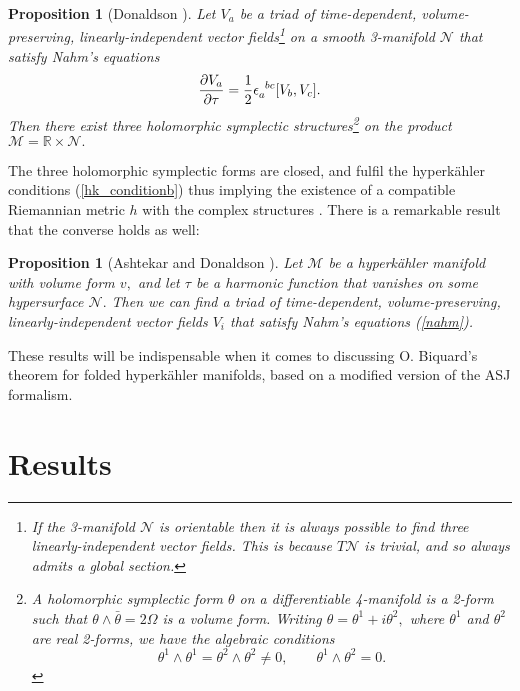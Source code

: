 \documentclass[a4paper,12pt, onecolumn, notitlepage]{article}
\newtheorem{prop}[thm]{Proposition}
\theoremstyle{definition}
\theoremstyle{remark}
\newcommand{\e}{\epsilon}
\newcommand{\ddt}[1]{\frac{\partial #1}{\partial \tau}}
\newcommand{\HK}{hyperk\"ahler }
\newcommand{\R}{\mathbb{R}}
\begin{document}
\begin{prop}[Donaldson \cite{donaldson}]
	Let $V_{a}$ be a triad of time-dependent, volume-preserving, linearly-independent vector fields\footnote{If the 3-manifold $\mathcal{N}$ is orientable then it is always possible to find three linearly-independent vector fields. This is because $T\mathcal{N}$ is trivial, and so always admits a global section.} on a smooth 3-manifold $\mathcal{N}$ that satisfy Nahm's equations
	$$\ddt{V_{a}} = \frac{1}{2}\e\indices{_a^b^c}[V_{b},V_{c}].
	$$
	Then there exist three holomorphic symplectic structures\footnote{A holomorphic symplectic form $\theta$ on a differentiable 4-manifold is a 2-form such that $\theta\wedge\bar{\theta}=2\Omega$ is a volume form. Writing $\theta = \theta^{1} + i\theta^{2},$ where $\theta^{1}$ and $\theta^{2}$ are real 2-forms, we have the algebraic conditions
		\begin{equation*}
		\theta^{1}\wedge\theta^{1}=\theta^{2}\wedge\theta^{2}\neq 0,\qquad \theta^{1}\wedge \theta^{2}=0.
		\end{equation*}}
	 on the product $\mathcal{M}=\R\times\mathcal{N}.$ 
\end{prop}
The three holomorphic symplectic forms are closed, and fulfil the \HK conditions (\ref{hk_conditionb}) thus implying the existence of a compatible Riemannian metric $h$ with the complex structures \cite{donaldson}. There is a remarkable result that the converse holds as well:\\

\begin{prop}[Ashtekar \cite{ashtekar_1988} and Donaldson \cite{donaldson}]
	Let $\mathcal{M}$ be a \HK manifold with volume form $v,$ and let $\tau$ be a harmonic function that vanishes on some hypersurface $\mathcal{N}.$ Then we can find a triad of time-dependent, volume-preserving, linearly-independent vector fields $V_{i}$ that satisfy Nahm's equations (\ref{nahm}).
\end{prop}

These results will be indispensable when it comes to discussing O. Biquard's theorem for folded \HK manifolds, based on a modified version of the ASJ formalism.
\section{Results}
\end{document}
